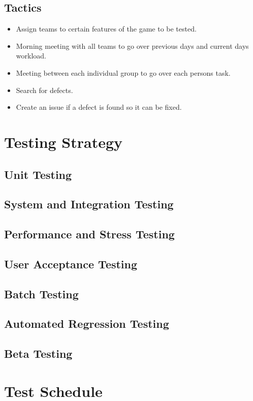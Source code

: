 \documentclass[a4paper, 10pt]{article}
\begin{document}
    \subsection{Tactics}
    \begin{itemize}
        \item Assign teams to certain features of the game to be tested.
        \item Morning meeting with all teams to go over previous days and current days workload.
        \item Meeting between each individual group to go over each persons task.
        \item Search for defects.
        \item Create an issue if a defect is found so it can be fixed.
    \end{itemize}
\section{Testing Strategy}
    \subsection{Unit Testing}
    \subsection{System and Integration Testing}
    \subsection{Performance and Stress Testing}
    \subsection{User Acceptance Testing}
    \subsection{Batch Testing}
    \subsection{Automated Regression Testing}
    \subsection{Beta Testing}

\section{Test Schedule}
\end{document}
